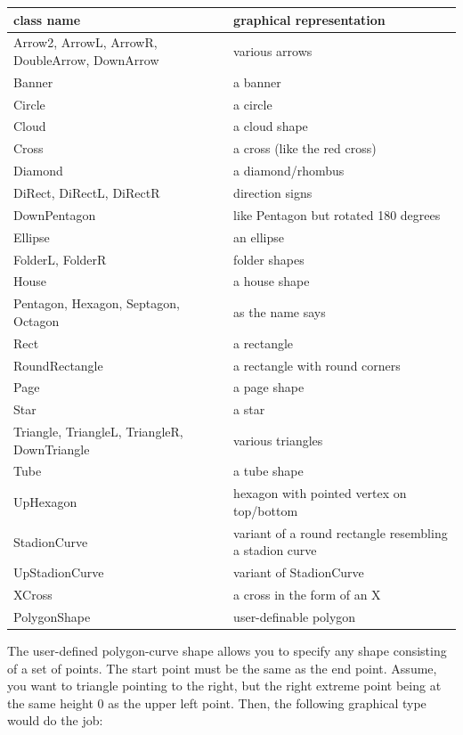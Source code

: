 \begin{tabular}{|p{4cm}|p{8
cm}|}
\hline
{\bf class name} & {\bf graphical representation} \\ \hline \hline
Arrow2, ArrowL, ArrowR, DoubleArrow, DownArrow & various arrows \\ \hline
Banner & a banner \\ \hline
Circle & a circle  \\ \hline
Cloud & a cloud shape  \\ \hline
Cross & a cross (like the red cross) \\ \hline
Diamond & a diamond/rhombus \\ \hline
DiRect, DiRectL, DiRectR & direction signs  \\ \hline
DownPentagon & like Pentagon but rotated 180 degrees \\ \hline
Ellipse & an ellipse \\ \hline
FolderL, FolderR & folder shapes \\ \hline
House & a house shape \\ \hline
Pentagon, Hexagon, Septagon, Octagon & as the name says \\ \hline
Rect & a rectangle \\ \hline
RoundRectangle & a rectangle with round corners \\ \hline
Page & a page shape \\ \hline
Star & a star \\ \hline
Triangle, TriangleL, TriangleR,  DownTriangle & various triangles\\ \hline
Tube & a tube shape \\ \hline
UpHexagon & hexagon with pointed vertex on top/bottom \\ \hline
StadionCurve & variant of a round rectangle resembling a stadion curve \\ \hline
UpStadionCurve & variant of StadionCurve \\ \hline
XCross & a cross in the form of an X \\ \hline
PolygonShape & user-definable polygon  \\ \hline
\end{tabular}

\vspace{0.7cm}


The user-defined polygon-curve shape allows you to specify any shape consisting of a 
set of points. The start point must be the same as the end point.
Assume, you want to triangle pointing to the right, but the right extreme point being at the same height 0
as the upper left point. Then, the following graphical type would do
the job:

